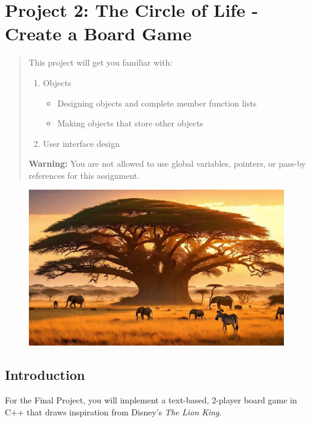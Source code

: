 \usepackage{enumitem}
\chapter*{Project 2: The Circle of Life - Create a Board Game}
\setcounter{chapter}{8}
\setcounter{section}{0}

\begin{abstract}
This project will get you familiar with:
\begin{enumerate}
    \item Objects
    \begin{itemize}
        \item Designing objects and complete member function lists
        \item Making objects that store other objects
    \end{itemize}
    \item User interface design
\end{enumerate}

\textbf{Warning:} You are not allowed to use global variables, pointers, or pass-by references for this assignment.

\end{abstract}

\begin{figure}[h!]
    \centering
    \includegraphics[width=0.75\linewidth]{images/Savanna.jpg}
\end{figure}


\section{\textbf{Introduction}}

For the Final Project, you will implement a text-based, 2-player board game in C++ that draws inspiration from Disney's \textit{The Lion King}. 

